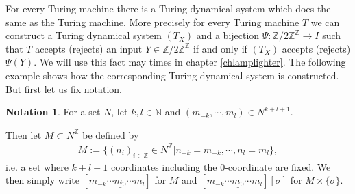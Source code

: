 \documentclass[12pt,a4paper]{scrartcl}
\theoremstyle{plain}
\theoremstyle{definition}
\newtheorem{Notation}[Theorem]{Notation}
\numberwithin{equation}{section}
\newcommand{\Z}{\mathbb{Z}} %
\newcommand{\N}{\mathbb{N}} %
\newcommand{\2}{\mathbb{Z} / 2 \mathbb{Z}}
\newcommand{\1}{\bar{1}}
\newcommand{\0}{\bar{0}}
\begin{document}
For every Turing machine there is a Turing dynamical system which does the same as the Turing machine. More precisely for every Turing machine $T$ we can construct a Turing dynamical system $(T_X)$ and a bijection $\Psi\colon\2^\Z \to I$ such that $T$ accepts (rejects) an input $Y \in \2^\Z$ if and only if $(T_X)$ accepts (rejects) $\Psi(Y)$. We will use this fact may times in chapter \ref{chlamplighter}. The following example shows how the corresponding Turing dynamical system is constructed. But first let us fix notation.
\begin{Notation} \label{notation_TM}
	For a set $N$, let $k,l \in \N$ and $ (m_{-k}, \cdots,  m_l) \in N^{k+l+1}$. 
	
	Then let $M \subset N^\Z$  be defined by 
	\begin{align*}
		M := \{(n_i)_{i \in \Z} \in N^\Z | n_{-k} = m_{-k}, \cdots, n_l = m_l \},
	\end{align*}
	i.e. a set where $k+l +1$ coordinates including the $0$-coordinate are fixed. We then simply write $[m_{-k} \cdots \underline{m_0} \cdots m_l]$ for $M$ and $[m_{-k} \cdots \underline{m_0} \cdots m_l][\sigma]$ for $M \times \{\sigma\}$.
\end{Notation}
\end{document}
